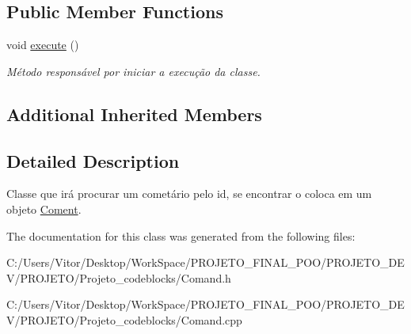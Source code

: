 \subsection*{Public Member Functions}
\begin{DoxyCompactItemize}
\item 
\hypertarget{class_command_find_coment_a5e0b7e24dbe78155bfef3a3e12f329de}{void \hyperlink{class_command_find_coment_a5e0b7e24dbe78155bfef3a3e12f329de}{execute} ()}\label{class_command_find_coment_a5e0b7e24dbe78155bfef3a3e12f329de}

\begin{DoxyCompactList}\small\item\em Método responsável por iniciar a execução da classe. \end{DoxyCompactList}\end{DoxyCompactItemize}
\subsection*{Additional Inherited Members}


\subsection{Detailed Description}
Classe que irá procurar um cometário pelo id, se encontrar o coloca em um objeto \hyperlink{class_coment}{Coment}. 

The documentation for this class was generated from the following files\-:\begin{DoxyCompactItemize}
\item 
C\-:/\-Users/\-Vitor/\-Desktop/\-Work\-Space/\-P\-R\-O\-J\-E\-T\-O\-\_\-\-F\-I\-N\-A\-L\-\_\-\-P\-O\-O/\-P\-R\-O\-J\-E\-T\-O\-\_\-\-D\-E\-V/\-P\-R\-O\-J\-E\-T\-O/\-Projeto\-\_\-codeblocks/Comand.\-h\item 
C\-:/\-Users/\-Vitor/\-Desktop/\-Work\-Space/\-P\-R\-O\-J\-E\-T\-O\-\_\-\-F\-I\-N\-A\-L\-\_\-\-P\-O\-O/\-P\-R\-O\-J\-E\-T\-O\-\_\-\-D\-E\-V/\-P\-R\-O\-J\-E\-T\-O/\-Projeto\-\_\-codeblocks/Comand.\-cpp\end{DoxyCompactItemize}
